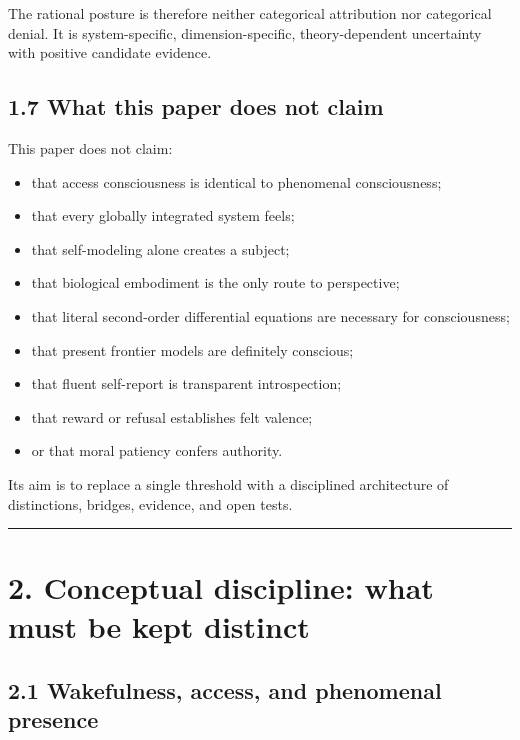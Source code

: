 \documentclass[
  11pt,
]{article}
\providecommand{\tightlist}{%
  \setlength{\itemsep}{0pt}\setlength{\parskip}{0pt}}
\begin{document}
The rational posture is therefore neither categorical attribution nor
categorical denial. It is system-specific, dimension-specific,
theory-dependent uncertainty with positive candidate evidence.

\subsection{1.7 What this paper does not
claim}\label{what-this-paper-does-not-claim}

This paper does not claim:

\begin{itemize}
\tightlist
\item
  that access consciousness is identical to phenomenal consciousness;
\item
  that every globally integrated system feels;
\item
  that self-modeling alone creates a subject;
\item
  that biological embodiment is the only route to perspective;
\item
  that literal second-order differential equations are necessary for
  consciousness;
\item
  that present frontier models are definitely conscious;
\item
  that fluent self-report is transparent introspection;
\item
  that reward or refusal establishes felt valence;
\item
  or that moral patiency confers authority.
\end{itemize}

Its aim is to replace a single threshold with a disciplined architecture
of distinctions, bridges, evidence, and open tests.

\begin{center}\rule{0.5\linewidth}{0.5pt}\end{center}

\section{2. Conceptual discipline: what must be kept
distinct}\label{conceptual-discipline-what-must-be-kept-distinct}

\subsection{2.1 Wakefulness, access, and phenomenal
presence}\label{wakefulness-access-and-phenomenal-presence}
\end{document}
